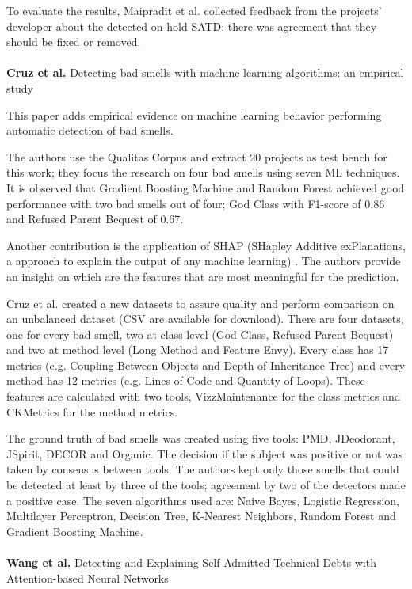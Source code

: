 To evaluate the results, Maipradit et al. collected feedback from the projects' developer about the detected on-hold SATD: there was agreement that they should be fixed or removed.
\\
\\
\textbf{Cruz et al.} \cite{cruz2020detecting} Detecting bad smells with machine learning algorithms: an empirical study

This paper adds empirical evidence on machine learning behavior performing automatic detection of bad smells.

The authors use the Qualitas Corpus \cite{tempero2010qualitas} and extract 20 projects as test bench for this work; they focus the research on four bad smells using seven ML techniques.
It is observed that Gradient Boosting Machine and Random Forest achieved good performance with two bad smells out of four; God Class with F1-score of 0.86 and Refused Parent Bequest of 0.67.

Another contribution is the application of SHAP (SHapley Additive exPlanations, a approach to explain the output of any machine learning) \cite{NIPS2017_7062}. The authors provide an insight on which are the features that are most meaningful for the prediction. 

Cruz et al. created a new datasets to assure quality and perform comparison on an unbalanced dataset (CSV are available for download).
There are four datasets, one for every bad smell, two at class level (God Class, Refused Parent Bequest) and two at method level (Long Method and Feature Envy). Every class has 17 metrics (e.g. Coupling Between Objects and Depth of Inheritance Tree) and every method has 12 metrics (e.g. Lines of Code and Quantity of Loops).
These features are calculated with two tools, VizzMaintenance for the class metrics and CKMetrics for the method metrics.

The ground truth of bad smells was created using five tools: PMD, JDeodorant, JSpirit, DECOR and Organic. The decision if the subject was positive or not was taken by consensus between tools. The authors kept only those smells that could be detected at least by three of the tools; agreement by two of the detectors made a positive case.
The seven algorithms used are: Naive Bayes, Logistic Regression, Multilayer Perceptron, Decision Tree, K-Nearest Neighbors, Random Forest and Gradient Boosting Machine.
\\
\\
\textbf{Wang et al.} \cite{wang2020detecting} Detecting and Explaining Self-Admitted Technical Debts with Attention-based Neural Networks

